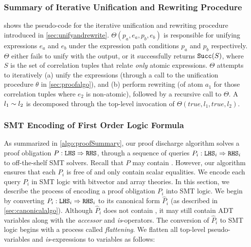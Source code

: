 

\subsubsection{Summary of Iterative Unification and Rewriting Procedure}
\label{sec:unifyandrewritealgo}
 shows the pseudo-code for the iterative unification and rewriting procedure
introduced in \cref{sec:unifyandrewrite}.
$\Theta(p_a,e_a,p_b,e_b)$ is responsible for unifying expressions $e_a$ and $e_b$ under the expression
path conditions $p_a$ and $p_b$ respectively.
$\Theta$ either fails to unify with the  output, or it successfully returns ${\tt Succ}(S)$, where $S$
is the set of correlation tuples that relate {\em only} atomic expressions.
$\Theta$ attempts to iteratively (a) unify the expressions (through a call to the unification procedure $\theta$ in \cref{sec:proofalgo}),
and (b) perform rewriting (of atom $a_1$ for those correlation tuples  where $e_2$ is non-atomic), followed by
a recursive call to $\Theta$.
A \recursiveRelation{} $l_1 \sim{} l_2$ is decomposed through the top-level invocation of $\Theta(true,l_1,true,l_2)$.



\subsubsection{SMT Encoding of First Order Logic Formula}
\label{sec:smtencoding}
As summarized in \cref{algo:proofSummary}, our proof discharge algorithm solves a proof obligation $P: {\tt LHS}{} \Rightarrow {\tt RHS}{}$,
through a sequence of queries $P_i : {\tt LHS}{}_i \Rightarrow {\tt RHS}{}_i$ to off-the-shelf SMT solvers.
Recall that $P$ may contain \recursiveRelations{}.
However, our algorithm ensures that each $P_i$ is free of \recursiveRelations{} and only contain
scalar equalities.
We encode each query $P_i$ in SMT logic with bitvector and array theories.
In this section, we describe the process of encoding a proof obligation $P_i$ into SMT logic.
We begin by converting $P_i : {\tt LHS}{}_i \Rightarrow {\tt RHS}{}_i$ to its canonical form $\hat{P}_i$
(as described in \cref{sec:canonicalalgo}).
Although $\hat{P}_i$ does not contain \recursiveRelations{}, it may still contain
ADT variables along with the {\em accessor} and {\em is}-operators.
The conversion of $\hat{P}_i$ to SMT logic begins with a process called {\em flattening}.
We flatten all top-level pseudo-variables and {\em is}-expressions to variables as follows:

